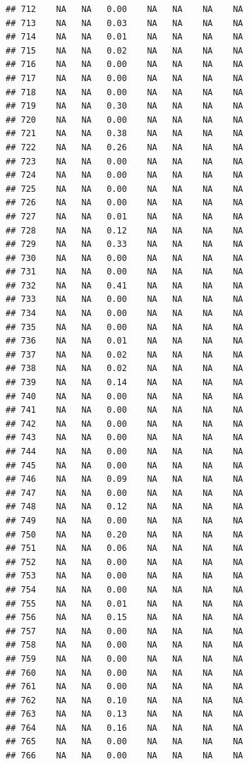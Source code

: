 \documentclass{article}\usepackage{graphicx, color}
\makeatletter
\newenvironment{kframe}{%
 \def\at@end@of@kframe{}%
 \ifinner\ifhmode%
  \def\at@end@of@kframe{\end{minipage}}%
  \begin{minipage}{\columnwidth}%
 \fi\fi%
 \def\FrameCommand##1{\hskip\@totalleftmargin \hskip-\fboxsep
 \colorbox{shadecolor}{##1}\hskip-\fboxsep
     \hskip-\linewidth \hskip-\@totalleftmargin \hskip\columnwidth}%
 \MakeFramed {\advance\hsize-\width
   \@totalleftmargin\z@ \linewidth\hsize
   \@setminipage}}%
 {\par\unskip\endMakeFramed%
 \at@end@of@kframe}
\newenvironment{knitrout}{}{} %
\makeatother
\begin{document}
\begin{knitrout}
\begin{kframe}
\begin{verbatim}
## 712    NA   NA   0.00    NA   NA    NA    NA
## 713    NA   NA   0.03    NA   NA    NA    NA
## 714    NA   NA   0.01    NA   NA    NA    NA
## 715    NA   NA   0.02    NA   NA    NA    NA
## 716    NA   NA   0.00    NA   NA    NA    NA
## 717    NA   NA   0.00    NA   NA    NA    NA
## 718    NA   NA   0.00    NA   NA    NA    NA
## 719    NA   NA   0.30    NA   NA    NA    NA
## 720    NA   NA   0.00    NA   NA    NA    NA
## 721    NA   NA   0.38    NA   NA    NA    NA
## 722    NA   NA   0.26    NA   NA    NA    NA
## 723    NA   NA   0.00    NA   NA    NA    NA
## 724    NA   NA   0.00    NA   NA    NA    NA
## 725    NA   NA   0.00    NA   NA    NA    NA
## 726    NA   NA   0.00    NA   NA    NA    NA
## 727    NA   NA   0.01    NA   NA    NA    NA
## 728    NA   NA   0.12    NA   NA    NA    NA
## 729    NA   NA   0.33    NA   NA    NA    NA
## 730    NA   NA   0.00    NA   NA    NA    NA
## 731    NA   NA   0.00    NA   NA    NA    NA
## 732    NA   NA   0.41    NA   NA    NA    NA
## 733    NA   NA   0.00    NA   NA    NA    NA
## 734    NA   NA   0.00    NA   NA    NA    NA
## 735    NA   NA   0.00    NA   NA    NA    NA
## 736    NA   NA   0.01    NA   NA    NA    NA
## 737    NA   NA   0.02    NA   NA    NA    NA
## 738    NA   NA   0.02    NA   NA    NA    NA
## 739    NA   NA   0.14    NA   NA    NA    NA
## 740    NA   NA   0.00    NA   NA    NA    NA
## 741    NA   NA   0.00    NA   NA    NA    NA
## 742    NA   NA   0.00    NA   NA    NA    NA
## 743    NA   NA   0.00    NA   NA    NA    NA
## 744    NA   NA   0.00    NA   NA    NA    NA
## 745    NA   NA   0.00    NA   NA    NA    NA
## 746    NA   NA   0.09    NA   NA    NA    NA
## 747    NA   NA   0.00    NA   NA    NA    NA
## 748    NA   NA   0.12    NA   NA    NA    NA
## 749    NA   NA   0.00    NA   NA    NA    NA
## 750    NA   NA   0.20    NA   NA    NA    NA
## 751    NA   NA   0.06    NA   NA    NA    NA
## 752    NA   NA   0.00    NA   NA    NA    NA
## 753    NA   NA   0.00    NA   NA    NA    NA
## 754    NA   NA   0.00    NA   NA    NA    NA
## 755    NA   NA   0.01    NA   NA    NA    NA
## 756    NA   NA   0.15    NA   NA    NA    NA
## 757    NA   NA   0.00    NA   NA    NA    NA
## 758    NA   NA   0.00    NA   NA    NA    NA
## 759    NA   NA   0.00    NA   NA    NA    NA
## 760    NA   NA   0.00    NA   NA    NA    NA
## 761    NA   NA   0.00    NA   NA    NA    NA
## 762    NA   NA   0.10    NA   NA    NA    NA
## 763    NA   NA   0.13    NA   NA    NA    NA
## 764    NA   NA   0.16    NA   NA    NA    NA
## 765    NA   NA   0.00    NA   NA    NA    NA
## 766    NA   NA   0.00    NA   NA    NA    NA

\end{verbatim}
\end{kframe}
\end{knitrout}
\end{document}
